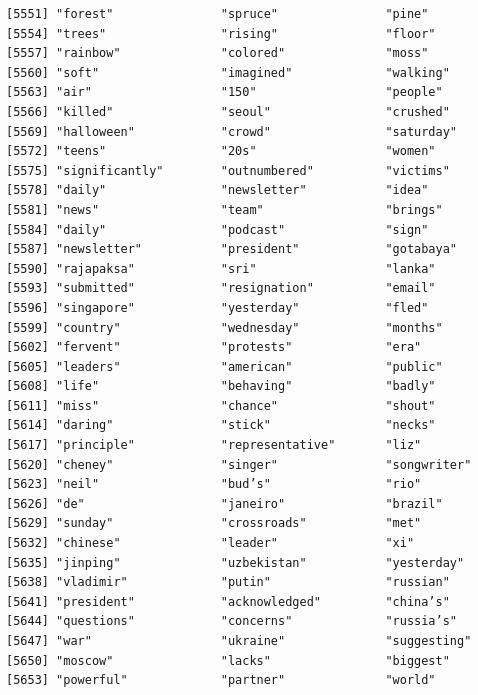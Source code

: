 \documentclass[
  letterpaper,
  DIV=11,
  numbers=noendperiod]{scrartcl}
\begin{document}
\begin{verbatim}
[5551] "forest"               "spruce"               "pine"                
[5554] "trees"                "rising"               "floor"               
[5557] "rainbow"              "colored"              "moss"                
[5560] "soft"                 "imagined"             "walking"             
[5563] "air"                  "150"                  "people"              
[5566] "killed"               "seoul"                "crushed"             
[5569] "halloween"            "crowd"                "saturday"            
[5572] "teens"                "20s"                  "women"               
[5575] "significantly"        "outnumbered"          "victims"             
[5578] "daily"                "newsletter"           "idea"                
[5581] "news"                 "team"                 "brings"              
[5584] "daily"                "podcast"              "sign"                
[5587] "newsletter"           "president"            "gotabaya"            
[5590] "rajapaksa"            "sri"                  "lanka"               
[5593] "submitted"            "resignation"          "email"               
[5596] "singapore"            "yesterday"            "fled"                
[5599] "country"              "wednesday"            "months"              
[5602] "fervent"              "protests"             "era"                 
[5605] "leaders"              "american"             "public"              
[5608] "life"                 "behaving"             "badly"               
[5611] "miss"                 "chance"               "shout"               
[5614] "daring"               "stick"                "necks"               
[5617] "principle"            "representative"       "liz"                 
[5620] "cheney"               "singer"               "songwriter"          
[5623] "neil"                 "bud’s"                "rio"                 
[5626] "de"                   "janeiro"              "brazil"              
[5629] "sunday"               "crossroads"           "met"                 
[5632] "chinese"              "leader"               "xi"                  
[5635] "jinping"              "uzbekistan"           "yesterday"           
[5638] "vladimir"             "putin"                "russian"             
[5641] "president"            "acknowledged"         "china’s"             
[5644] "questions"            "concerns"             "russia’s"            
[5647] "war"                  "ukraine"              "suggesting"          
[5650] "moscow"               "lacks"                "biggest"             
[5653] "powerful"             "partner"              "world"               

\end{verbatim}
\end{document}
